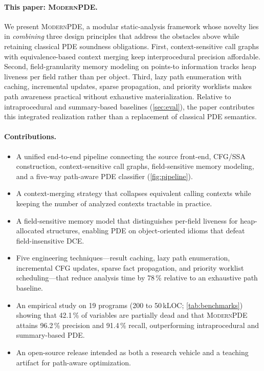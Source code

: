 \documentclass[acmsmall,screen,review,anonymous]{acmart}
\begin{document}
\paragraph{This paper: \textsc{ModernPDE}.}
We present \textsc{ModernPDE}, a modular static-analysis framework whose novelty lies in \emph{combining} three design principles that address the obstacles above while retaining classical PDE soundness obligations. First, context-sensitive call graphs with equivalence-based context merging keep interprocedural precision affordable. Second, field-granularity memory modeling on points-to information tracks heap liveness per field rather than per object. Third, lazy path enumeration with caching, incremental updates, sparse propagation, and priority worklists makes path awareness practical without exhaustive materialization. Relative to intraprocedural and summary-based baselines (\autoref{sec:eval}), the paper contributes this integrated realization rather than a replacement of classical PDE semantics.

\paragraph{Contributions.}
\begin{itemize}
\item A unified end-to-end pipeline connecting the source front-end, CFG/SSA construction, context-sensitive call graphs, field-sensitive memory modeling, and a five-way path-aware PDE classifier (\autoref{fig:pipeline}).
\item A context-merging strategy that collapses equivalent calling contexts while keeping the number of analyzed contexts tractable in practice.
\item A field-sensitive memory model that distinguishes per-field liveness for heap-allocated structures, enabling PDE on object-oriented idioms that defeat field-insensitive DCE.
\item Five engineering techniques---result caching, lazy path enumeration, incremental CFG updates, sparse fact propagation, and priority worklist scheduling---that reduce analysis time by 78\,\% relative to an exhaustive path baseline.
\item An empirical study on 19 programs (200 to 50\,kLOC; \autoref{tab:benchmarks}) showing that 42.1\,\% of variables are partially dead and that \textsc{ModernPDE} attains 96.2\,\% precision and 91.4\,\% recall, outperforming intraprocedural and summary-based PDE.
\item An open-source release intended as both a research vehicle and a teaching artifact for path-aware optimization.
\end{itemize}
\end{document}
